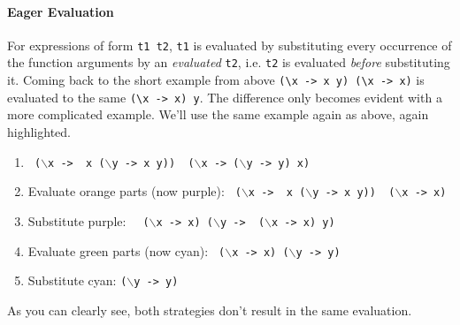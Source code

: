 \paragraph{Eager Evaluation}
For expressions of form \texttt{t1 t2}, \texttt{t1} is evaluated by substituting every occurrence of the function arguments by an \textit{evaluated} \texttt{t2},
i.e. \texttt{t2} is evaluated \textit{before} substituting it.
Coming back to the short example from above \verb|(\x -> x y) (\x -> x)| is evaluated to the same \verb|(\x -> x) y|.
The difference only becomes evident with a more complicated example. We'll use the same example again as above, again highlighted.
\begin{enumerate}
    \item \texttt{{\color{red} ($\backslash$x ->} {\color{ForestGreen} x ($\backslash$y -> x y)}{\color{red})} {\color{orange} ($\backslash$x -> ($\backslash$y -> y) x)}}
    \item Evaluate {\color{orange} orange parts} (now {\color{purple} purple}):
          \texttt{{\color{red} ($\backslash$x ->} {\color{ForestGreen} x ($\backslash$y -> x y)}{\color{red})} {\color{purple} ($\backslash$x -> x)}}
    \item Substitute {\color{purple} purple}:
          \texttt{{\color{ForestGreen} {\color{purple} ($\backslash$x -> x)} ($\backslash$y -> {\color{purple} ($\backslash$x -> x)} y)}}
    \item Evaluate {\color{ForestGreen} green} parts (now {\color{cyan} cyan}):
          \texttt{{\color{purple} ($\backslash$x -> x)} {\color{cyan}($\backslash$y -> y)}}
    \item Substitute {\color{cyan} cyan}:
          \texttt{{\color{cyan}($\backslash$y -> y)}}
\end{enumerate}
As you can clearly see, both strategies don't result in the same evaluation.
